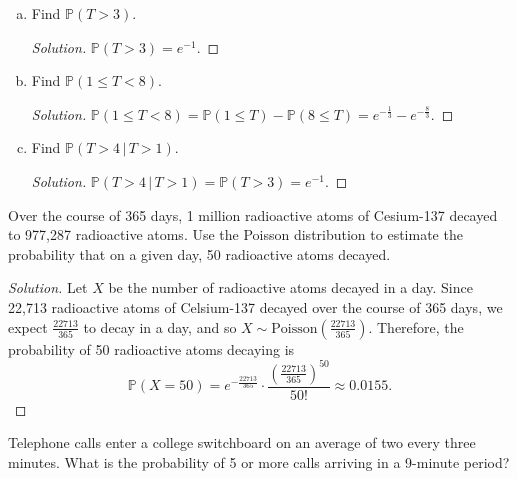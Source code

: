 \documentclass[addpoints, 11pt]{exam}
\newcommand*{\prob}{\mathds{P}}
\newenvironment{question}[1]{\smallskip\noindent\color{crimson}{\bf Question #1.}}{}
\begin{document}
\begin{enumerate}[(a)]
    \color{crimson}
    \item  Find $\prob(T > 3)$.
    \normalcolor

    \begin{proof}[Solution]
        $\prob(T > 3) = e^{-1}$.
    \end{proof}

    \color{crimson}
    \item  Find $\prob(1 \leq T < 8)$.
    \normalcolor

    \begin{proof}[Solution]
        $\prob(1 \leq T < 8) = \prob(1 \leq T) - \prob(8 \leq T) = e^{-\frac{1}{3}} - e^{-\frac{8}{3}}$.
    \end{proof}

    \color{crimson}
    \item  Find $\prob(T > 4 \, | \, T > 1)$.
    \normalcolor

    \begin{proof}[Solution]
        $\prob(T > 4 \, | \, T > 1) = \prob(T > 3) = e^{-1}$.
    \end{proof}
\end{enumerate}

\newpage

\begin{question}{6}
    Over the course of 365 days, 1 million radioactive atoms of Cesium-137 decayed to 977,287 radioactive atoms. Use the Poisson distribution to estimate the probability that on a given day, 50 radioactive atoms decayed.
\end{question}

\begin{proof}[Solution]
    Let $X$ be the number of radioactive atoms decayed in a day. Since 22,713 radioactive atoms of Celsium-137 decayed over the course of 365 days, we expect $\frac{22713}{365}$ to decay in a day, and so $X \sim \text{Poisson}\left(\frac{22713}{365}\right)$. Therefore, the probability of 50 radioactive atoms decaying is
    \[
        \prob(X = 50) = e^{-\frac{22713}{365}} \cdot \frac{\left(\frac{22713}{365}\right)^{50}}{50!} \approx 0.0155.
    \]
\end{proof}

\newpage

\begin{question}{7}
    Telephone calls enter a college switchboard on an average of two every three minutes. What is the probability of 5 or more calls arriving in a 9-minute period?
\end{question}
\end{document}
